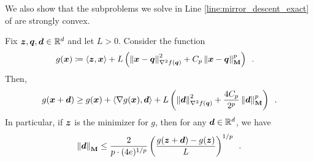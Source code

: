 We also show that the subproblems we solve in Line \ref{line:mirror_descent_exact} of  are strongly convex.
\begin{lemma}
\label{lemma:gp_h_strongly_convex}
Fix $\bm{z}, \bm{q}, \bm{d} \in \mathbb{R}^d$ and let $L > 0$. Consider the function
\begin{align*}
    g(\bm{x}) &\coloneqq \left\langle \bm{z},\bm{x} \right\rangle + L\left(\left\lVert \bm{x}-\bm{q} \right\rVert_{\nabla^2 f(\bm{q})}^2 + C_p\left\lVert \bm{x}-\bm{q} \right\rVert_{\mathbf{M}}^p\right)\enspace.
\end{align*}
Then,
\begin{align*}
    g(\bm{x}+\bm{d}) \ge g(\bm{x}) + \left\langle \nabla g(\bm{x}),\bm{d} \right\rangle + L\left(\left\lVert \bm{d} \right\rVert_{\nabla^2 f(\bm{q})}^2 + \frac{4C_p}{2^p}\left\lVert \bm{d} \right\rVert_{\mathbf{M}}^p\right)\enspace.
\end{align*}
In particular, if $\bm{z}$ is the minimizer for $g$, then for any $\bm{d}\in\mathbb{R}^d$, we have
\begin{align*}
    \left\lVert \bm{d} \right\rVert_{\mathbf{M}} \le \frac{2}{p \cdot (4e)^{1/p}}\left(\frac{g(\bm{z}+\bm{d}) - g(\bm{z})}{L}\right)^{1/p}\enspace.
\end{align*}
\end{lemma}
